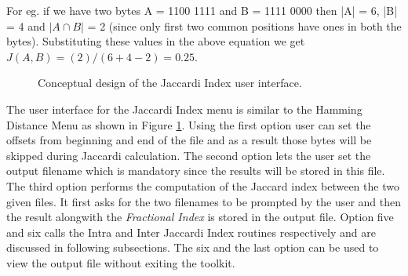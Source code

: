 	For eg. if we have two bytes A = 1100 1111 and B = 1111 0000 then |A| = 6, |B| = 4 and $|A \cap B|$ = 2 (since only first two common positions have ones in both the bytes). Substituting these values in the above equation we get $J(A,B) = (2) / ( 6 + 4 - 2) = 0.25$.\\

	\begin{figure}[h]
	\centering
	\caption{Conceptual design of the Jaccardi Index user interface.}
	\label{img:jaccard_ui}
	\end{figure}
	The user interface for the Jaccardi Index menu is similar to the Hamming Distance Menu as shown in Figure \ref{img:jaccard_ui}. Using the first option user can set the offsets from beginning and end of the file and as a result those bytes will be skipped during Jaccardi calculation. The second option lets the user set the output filename which is mandatory since the results will be stored in this file. The third option performs the computation of the Jaccard index between the two given
	files. It first asks for the two filenames to be prompted by the user and then the result alongwith the \emph{Fractional Index} is stored in the output file. Option five and six calls the Intra and Inter Jaccardi Index routines respectively and are discussed in following subsections. The six and the last option can be used to view the output file without exiting the toolkit.\\

